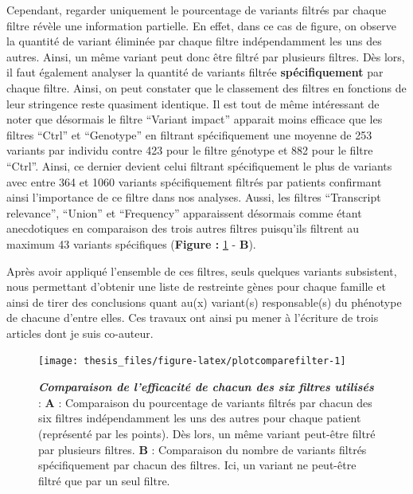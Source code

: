 \documentclass[12pt,a4paper,twoside]{ugathesis}
\theoremstyle{definition}
\theoremstyle{definition}
\theoremstyle{definition}
\theoremstyle{remark}
\begin{document}
Cependant, regarder uniquement le pourcentage de variants filtrés par
chaque filtre révèle une information partielle. En effet, dans ce cas de
figure, on observe la quantité de variant éliminée par chaque filtre
indépendamment les uns des autres. Ainsi, un même variant peut donc être
filtré par plusieurs filtres. Dès lors, il faut également analyser la
quantité de variants filtrée \textbf{spécifiquement} par chaque filtre.
Ainsi, on peut constater que le classement des filtres en fonctions de
leur stringence reste quasiment identique. Il est tout de même
intéressant de noter que désormais le filtre ``Variant impact'' apparait
moins efficace que les filtres ``Ctrl'' et ``Genotype'' en filtrant
spécifiquement une moyenne de 253 variants par individu contre 423 pour
le filtre génotype et 882 pour le filtre ``Ctrl''. Ainsi, ce dernier
devient celui filtrant spécifiquement le plus de variants avec entre 364
et 1060 variants spécifiquement filtrés par patients confirmant ainsi
l'importance de ce filtre dans nos analyses. Aussi, les filtres
``Transcript relevance'', ``Union'' et ``Frequency'' apparaissent
désormais comme étant anecdotiques en comparaison des trois autres
filtres puisqu'ils filtrent au maximum 43 variants spécifiques
(\textbf{Figure :} \ref{fig:plotcomparefilter} - \textbf{B}).

Après avoir appliqué l'ensemble de ces filtres, seuls quelques variants
subsistent, nous permettant d'obtenir une liste de restreinte gènes pour
chaque famille et ainsi de tirer des conclusions quant au(x) variant(s)
responsable(s) du phénotype de chacune d'entre elles. Ces travaux ont
ainsi pu mener à l'écriture de trois articles dont je suis co-auteur.

\newpage

\begin{figure}

{\centering \texttt{[image: thesis\_files/figure-latex/plotcomparefilter-1]} 

}

\caption[Comparaison de l'efficacité de chacun des six filtres utilisés]{\textbf{\emph{Comparaison de l'efficacité de
chacun des six filtres utilisés}} : \textbf{A} : Comparaison du
pourcentage de variants filtrés par chacun des six filtres
indépendamment les uns des autres pour chaque patient (représenté par
les points). Dès lors, un même variant peut-être filtré par plusieurs
filtres. \textbf{B} : Comparaison du nombre de variants filtrés
spécifiquement par chacun des filtres. Ici, un variant ne peut-être
filtré que par un seul filtre.}\label{fig:plotcomparefilter}
\end{figure}
\end{document}
